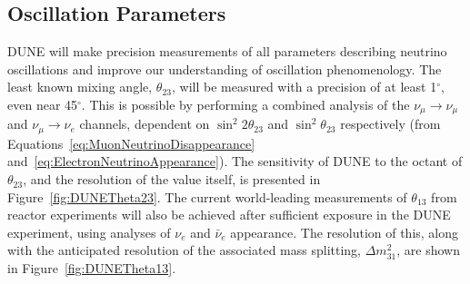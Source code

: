 \subsection{Oscillation Parameters}\label{sec:DUNEOscillationParameters}

DUNE will make precision measurements of all parameters describing neutrino oscillations and improve our understanding of oscillation phenomenology.  The least known mixing angle, $\theta_{23}$, will be measured with a precision of at least 1$^{\circ}$, even near 45$^{\circ}$.  This is possible by performing a combined analysis of the $\nu_{\mu}\rightarrow\nu_{\mu}$ and $\nu_{\mu}\rightarrow\nu_e$ channels, dependent on $\sin^2{2\theta_{23}}$ and $\sin^2{\theta_{23}}$ respectively (from Equations~\ref{eq:MuonNeutrinoDisappearance} and~\ref{eq:ElectronNeutrinoAppearance}).  The sensitivity of DUNE to the octant of $\theta_{23}$, and the resolution of the value itself, is presented in Figure~\ref{fig:DUNETheta23}.  The current world-leading measurements of $\theta_{13}$ from reactor experiments will also be achieved after sufficient exposure in the DUNE experiment, using analyses of $\nu_e$ and $\bar{\nu}_e$ appearance.  The resolution of this, along with the anticipated resolution of the associated mass splitting, $\Delta m_{31}^2$, are shown in Figure~\ref{fig:DUNETheta13}.


